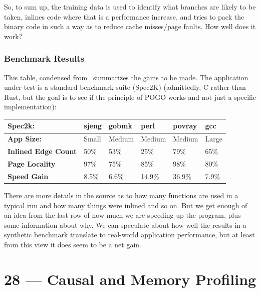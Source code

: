 \documentclass[a4paper]{report}
\begin{document}
So, to sum up, the training data is used to identify what branches are likely to be taken, inlines code where that is a performance increase, and tries to pack the binary code in such a way as to reduce cache misses/page faults. How well does it work?

\subsection*{Benchmark Results}

This table, condensed from~\cite{pogo2} summarizes the gains to be made. The application under test is a standard benchmark suite (Spec2K) (admittedly, C rather than Rust, but the goal is to see if the principle of POGO works and not just a specific implementation):

\begin{center}
\begin{tabular}{l|l|l|l|l|l}
	\textbf{Spec2k:} & \textbf{sjeng} & \textbf{gobmk} & \textbf{perl} & \textbf{povray} & \textbf{gcc}\\ \hline
	\textbf{App Size:} &  {Small} & {Medium} & {Medium} & {Medium} & {Large} \\ \hline
	\textbf{Inlined Edge Count} & 50\% & 53\% & 25\% & 79\% & 65\% \\ \hline
	\textbf{Page Locality} & 97\% & 75\% & 85\% & 98\% & 80\% \\ \hline
	\textbf{Speed Gain} & 8.5\% & 6.6\% & 14.9\% & 36.9\% & 7.9\% \\ 
\end{tabular}
\end{center}

There are more details in the source as to how many functions are used in a typical run and how many things were inlined and so on. But we get enough of an idea from the last row of how much we are speeding up the program, plus some information about why. We can speculate about how well the results in a synthetic benchmark translate to real-world application performance, but at least from this view it does seem to be a net gain.











\chapter*{28 --- Causal and Memory Profiling}
\end{document}
